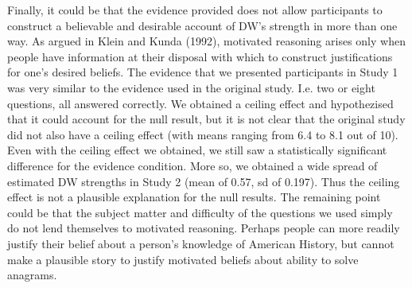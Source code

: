 \documentclass{article}
\begin{document}
Finally, it could be that the evidence provided does not allow participants to construct a believable and desirable account of DW's strength in more than one way. As argued in Klein and Kunda (1992), motivated reasoning arises only when people have information at their disposal with which to construct justifications for one's desired beliefs. The evidence that we presented participants in Study 1 was very similar to the evidence used in the original study. I.e. two or eight questions, all answered correctly. We obtained a ceiling effect and hypothezised that it could account for the null result, but it is not clear that the original study did not also have a ceiling effect (with means ranging from 6.4 to 8.1 out of 10). Even with the ceiling effect we obtained, we still saw a statistically significant difference for the evidence condition. More so, we obtained a wide spread of estimated DW strengths in Study 2 (mean of 0.57, sd of 0.197). Thus the ceiling effect is not a plausible explanation for the null results. The remaining point could be that the subject matter and difficulty of the questions we used simply do not lend themselves to motivated reasoning. Perhaps people can more readily justify their belief about a person's knowledge of American History, but cannot make a plausible story to justify motivated beliefs about ability to solve anagrams. 



\setlength{\bibleftmargin}{.125in}
\setlength{\bibindent}{-\bibleftmargin}


\end{document}
